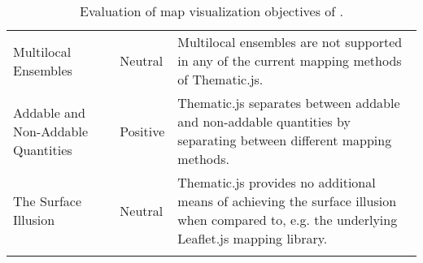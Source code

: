 \begin{longtable}{|p{3cm}|p{2.5cm}|p{7.5cm}|}
Multilocal Ensembles & Neutral &  Multilocal ensembles are not supported in any of the current mapping methods of Thematic.js. \\[0.5em]
Addable and Non-Addable Quantities & Positive & Thematic.js separates between addable and non-addable quantities by separating between different mapping methods. \\[0.5em]
The Surface Illusion & Neutral & Thematic.js provides no additional means of achieving the surface illusion when compared to, e.g. the underlying Leaflet.js mapping library. \\[0.5em]
\hline
\caption{Evaluation of map visualization objectives of \citet{schlichtmann_visualization_2002}.}
\label{table:objectivesevaluation}
\end{longtable}